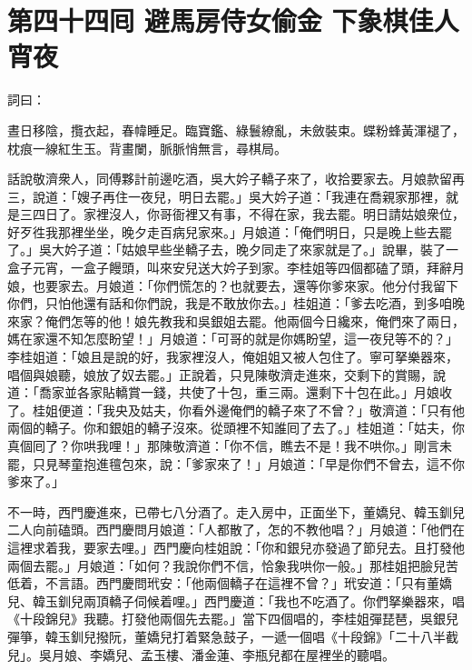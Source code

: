 
\chapter*{第四十四囘 避馬房侍女偷金 下象棋佳人宵夜}


詞曰：

\begin{myquote}
晝日移陰，攬衣起，春幃睡足。臨寶鑑、綠鬟繚亂，未斂裝束。蝶粉蜂黃渾褪了，枕痕一線紅生玉。背畫闌，脈脈悄無言，尋棋局。

\end{myquote}

話說敬濟衆人，同傅夥計前邊吃酒，吳大妗子轎子來了，收拾要家去。月娘款留再三，說道：「嫂子再住一夜兒，明日去罷。」吳大妗子道：「我連在喬親家那裡，就是三四日了。家裡沒人，你哥衙裡又有事，不得在家，我去罷。明日請姑娘衆位，好歹徃我那裡坐坐，晚夕走百病兒家來。」月娘道：「俺們明日，只是晚上些去罷了。」吳大妗子道：「姑娘早些坐轎子去，晚夕同走了來家就是了。」說畢，裝了一盒子元宵，一盒子饅頭，叫來安兒送大妗子到家。李桂姐等四個都磕了頭，拜辭月娘，也要家去。月娘道：「你們慌怎的？也就要去，還等你爹來家。他分付我留下你們，只怕他還有話和你們說，我是不敢放你去。」桂姐道：「爹去吃酒，到多咱晚來家？俺們怎等的他！娘先教我和吳銀姐去罷。他兩個今日纔來，俺們來了兩日，媽在家還不知怎麼盼望！」月娘道：「可哥的就是你媽盼望，這一夜兒等不的？」李桂姐道：「娘且是說的好，我家裡沒人，俺姐姐又被人包住了。寧可拏樂器來，唱個與娘聽，娘放了奴去罷。」正說着，只見陳敬濟走進來，交剩下的賞賜，說道：「喬家並各家貼轎賞一錢，共使了十包，重三兩。還剩下十包在此。」月娘收了。桂姐便道：「我央及姑夫，你看外邊俺們的轎子來了不曾？」敬濟道：「只有他兩個的轎子。你和銀姐的轎子沒來。從頭裡不知誰囘了去了。」桂姐道：「姑夫，你真個囘了？你哄我哩！」那陳敬濟道：「你不信，瞧去不是！我不哄你。」剛言未罷，只見琴童抱進氊包來，說：「爹家來了！」月娘道：「早是你們不曾去，這不你爹來了。」

不一時，西門慶進來，已帶七八分酒了。走入房中，正面坐下，董嬌兒、韓玉釧兒二人向前磕頭。西門慶問月娘道：「人都散了，怎的不教他唱？」月娘道：「他們在這裡求着我，要家去哩。」西門慶向桂姐說：「你和銀兒亦發過了節兒去。且打發他兩個去罷。」月娘道：「如何？我說你們不信，恰象我哄你一般。」那桂姐把臉兒苦低着，不言語。{}西門慶問玳安：「他兩個轎子在這裡不曾？」玳安道：「只有董嬌兒、韓玉釧兒兩頂轎子伺候着哩。」西門慶道：「我也不吃酒了。你們拏樂器來，唱《十段錦兒》我聽。打發他兩個先去罷。」當下四個唱的，李桂姐彈琵琶，吳銀兒彈箏，韓玉釧兒撥阮，董嬌兒打着緊急鼓子，一遞一個唱《十段錦》「二十八半截兒」。吳月娘、李嬌兒、孟玉樓、潘金蓮、李瓶兒都在屋裡坐的聽唱。

